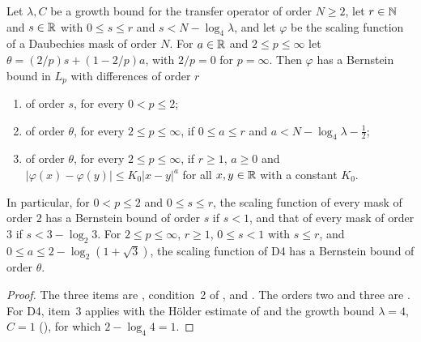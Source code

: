 \begin{proposition}
\label{prop:daub-bernstein-bounds}
\leanok
{}
Let $\lambda, C$ be a growth bound for the transfer operator of order $N \geq 2$, let
$r \in \mathbb{N}$ and $s \in \mathbb{R}$ with $0 \leq s \leq r$ and $s < N - \log_4 \lambda$, and let $\varphi$
be the scaling function of a Daubechies mask of order $N$. For $a \in \mathbb{R}$ and
$2 \leq p \leq \infty$ let $\theta = (2/p) s + (1 - 2/p) a$, with $2/p = 0$ for $p = \infty$.
Then $\varphi$ has a Bernstein bound in $L_p$ with differences of order $r$
\begin{enumerate}
  \item of order $s$, for every $0 < p \leq 2$;
  \item of order $\theta$, for every $2 \leq p \leq \infty$, if $0 \leq a \leq r$ and
    $a < N - \log_4 \lambda - \frac12$;
  \item of order $\theta$, for every $2 \leq p \leq \infty$, if $r \geq 1$, $a \geq 0$ and
    $|\varphi(x) - \varphi(y)| \leq K_0 |x - y|^a$ for all $x, y \in \mathbb{R}$ with a constant $K_0$.
\end{enumerate}
In particular, for $0 < p \leq 2$ and $0 \leq s \leq r$, the scaling function of every mask of
order $2$ has a Bernstein bound of order $s$ if $s < 1$, and that of every mask of order $3$ if
$s < 3 - \log_2 3$. For $2 \leq p \leq \infty$, $r \geq 1$, $0 \leq s < 1$ with $s \leq r$, and
$0 \leq a \leq 2 - \log_2(1 + \sqrt 3)$, the scaling function of D4 has a Bernstein bound of
order $\theta$.
\end{proposition}

\begin{proof}
\leanok
{}
The three items are , condition~2 of ,
and . The orders two and three are
. For D4, item~3 applies with the H\"older estimate of
 and the growth bound $\lambda = 4$, $C = 1$
(), for which $2 - \log_4 4 = 1$.
\end{proof}


